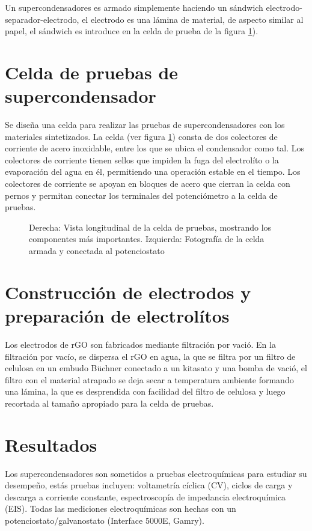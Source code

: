 Un supercondensadores es armado simplemente haciendo un sándwich electrodo-separador-electrodo, el electrodo es una lámina de material, de aspecto similar al papel, el sándwich es introduce en la celda de prueba de la figura \ref{fig:celda_de_pruebas_SC}). 

\section{Celda de pruebas de supercondensador}
Se diseña una celda para realizar las pruebas de supercondensadores con los materiales sintetizados. La celda (ver figura \ref{fig:celda_de_pruebas_SC}) consta de dos colectores de corriente de acero inoxidable, entre los que se ubica el condensador como tal. Los colectores de corriente tienen sellos que impiden la fuga del electrolíto o la evaporación del agua en él, permitiendo una operación estable en el tiempo. Los colectores de corriente se apoyan en bloques de acero que cierran la celda con pernos y permitan conectar los terminales del potenciómetro a la celda de pruebas.

\begin{figure}[h!]
	\centering
	\caption{Derecha: Vista longitudinal de la celda de pruebas, mostrando los componentes más importantes. Izquierda: Fotografía de la celda armada y conectada al potenciostato }
	\label{fig:celda_de_pruebas_SC}
\end{figure}

\section{Construcción de electrodos y preparación de electrolítos}
Los electrodos de rGO son fabricados mediante filtración por vació. En la filtración por vacío, se dispersa el rGO en agua, la que se filtra por un filtro de celulosa en un embudo Büchner conectado a un kitasato y una bomba de vació, el filtro con el material atrapado se deja secar a temperatura ambiente formando una lámina, la que es desprendida con facilidad del filtro de celulosa y luego recortada al tamaño apropiado para la celda de pruebas.

\section{Resultados}
Los supercondensadores son sometidos a pruebas electroquímicas para estudiar su desempeño, estás pruebas incluyen: voltametría cíclica (CV), ciclos de carga y descarga a corriente constante, espectroscopía de impedancia electroquímica (EIS). Todas las mediciones electroquímicas son hechas con un potenciostato/galvanostato (Interface 5000E, Gamry).

